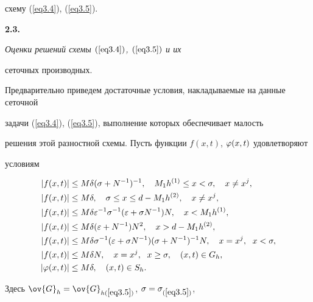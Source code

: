 схему (\ref{eq3.4}), (\ref{eq3.5}).


\medskip





{\bf 2.3.} {\it Оценки решений схемы $(\ref{eq3.4})$, $(\ref{eq3.5})$ и их


сеточных производных.}


Предварительно приведем достаточные условия, накладываемые на данные сеточной


задачи (\ref{eq3.4}), (\ref{eq3.5}), выполнение которых обеспечивает малость


решения этой разностной схемы. Пусть функции $f(x,t)$, $\varphi(x,t)$ удовлетворяют


условиям


\begin{equation}


\label{eq3.6}


\begin{split}


|f(x,t)|&\le M\delta(\sigma+N^{-1})^{-1},\quad M_1h^{(1)}\le x< \sigma,\quad


x\neq x^j,\\


|f(x,t)|&\le M\delta,\quad \sigma\le x\le d-M_1h^{(2)},\quad x\neq x^j,\\


|f(x,t)|&\le M\delta\eps^{-1}\sigma^{-1}(\eps+\sigma N^{-1})N,


\quad x< M_1 h^{(1)},\\


|f(x,t)|&\le M\delta(\eps+N^{-1})N^2,\quad x> d-M_1 h^{(2)},\\


|f(x,t)|&\le M\delta\sigma^{-1}(\eps+\sigma N^{-1})(\sigma+N^{-1})^{-1} N,


\quad x=x^j,\ \; x<\sigma,\\


|f(x,t)|&\le M\delta N, \quad  x=x^j,\ \; x\ge \sigma,


\quad (x,t)\in G_h,\\


|\f(x,t)|&\le M\delta,\quad (x,t)\in S_h.


\end{split}


\end{equation}


Здесь $\ov{G}_h=\ov{G}_{h(\ref{eq3.5})}$, $\sigma=\sigma_{(\ref{eq3.5})}$,


